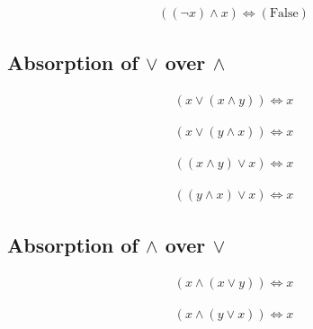\begin{prop}
\label{Proposition:land_complement_2}
\begin{align*}
((\lnot x) \land x) \iff (\text{False})
\end{align*}
\end{prop}

\subsection{Absorption of $\lor$ over $\land$}
\begin{prop}
\label{Proposition:lor_land_absorption_1}
\begin{align*}
(x \lor (x \land y)) \iff x
\end{align*}
\end{prop}

\begin{prop}
\label{Proposition:lor_land_absorption_2}
\begin{align*}
(x \lor (y \land x)) \iff x
\end{align*}
\end{prop}

\begin{prop}
\label{Proposition:lor_land_absorption_3}
\begin{align*}
((x \land y) \lor x) \iff x
\end{align*}
\end{prop}

\begin{prop}
\label{Proposition:lor_land_absorption_4}
\begin{align*}
((y \land x) \lor x) \iff x
\end{align*}
\end{prop}

\subsection{Absorption of $\land$ over $\lor$}
\begin{prop}
\label{Proposition:land_lor_absorption_1}
\begin{align*}
(x \land (x \lor y)) \iff x
\end{align*}
\end{prop}

\begin{prop}
\label{Proposition:land_lor_absorption_2}
\begin{align*}
(x \land (y \lor x)) \iff x
\end{align*}
\end{prop}

